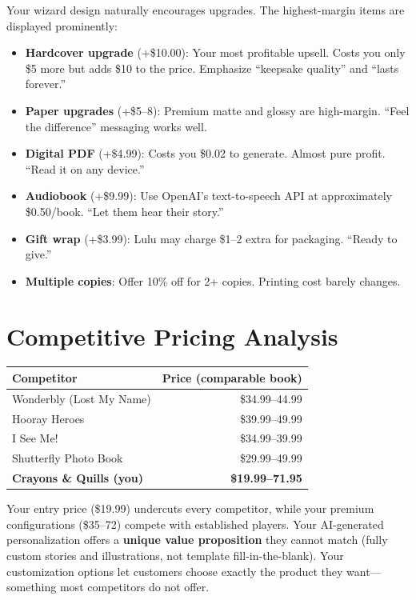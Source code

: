\documentclass[12pt, letterpaper, oneside]{book}
\begin{document}
Your wizard design naturally encourages upgrades. The highest-margin items are displayed prominently:

\begin{itemize}[leftmargin=2em]
  \item \textbf{Hardcover upgrade} (+\$10.00): Your most profitable upsell. Costs you only \$5 more but adds \$10 to the price. Emphasize ``keepsake quality'' and ``lasts forever.''
  \item \textbf{Paper upgrades} (+\$5--8): Premium matte and glossy are high-margin. ``Feel the difference'' messaging works well.
  \item \textbf{Digital PDF} (+\$4.99): Costs you \$0.02 to generate. Almost pure profit. ``Read it on any device.''
  \item \textbf{Audiobook} (+\$9.99): Use OpenAI's text-to-speech API at approximately \$0.50/book. ``Let them hear their story.''
  \item \textbf{Gift wrap} (+\$3.99): Lulu may charge \$1--2 extra for packaging. ``Ready to give.''
  \item \textbf{Multiple copies}: Offer 10\% off for 2+ copies. Printing cost barely changes.
\end{itemize}

\section{Competitive Pricing Analysis}

\begin{table}[H]
\centering
\begin{tabularx}{\textwidth}{Xr}
\toprule
\textbf{Competitor} & \textbf{Price (comparable book)} \\
\midrule
Wonderbly (Lost My Name) & \$34.99--44.99 \\
Hooray Heroes & \$39.99--49.99 \\
I See Me! & \$34.99--39.99 \\
Shutterfly Photo Book & \$29.99--49.99 \\
\textbf{Crayons \& Quills (you)} & \textbf{\$19.99--71.95} \\
\bottomrule
\end{tabularx}
\end{table}

\noindent Your entry price (\$19.99) undercuts every competitor, while your premium configurations (\$35--72) compete with established players. Your AI-generated personalization offers a \textbf{unique value proposition} they cannot match (fully custom stories and illustrations, not template fill-in-the-blank). Your customization options let customers choose exactly the product they want---something most competitors do not offer.
\end{document}
